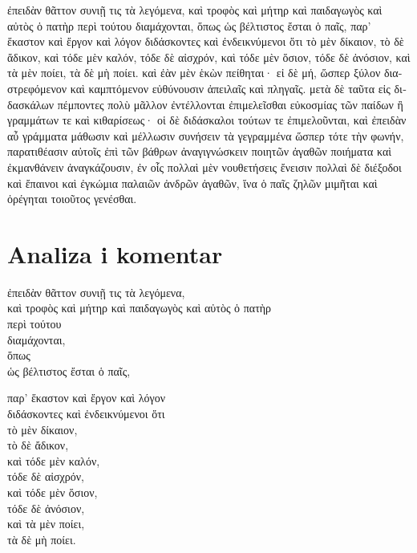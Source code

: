 {\large

\begin{greek}

\noindent ἐπειδὰν θᾶττον συνιῇ τις τὰ λεγόμενα, καὶ τροφὸς καὶ μήτηρ καὶ παιδαγωγὸς καὶ αὐτὸς ὁ πατὴρ περὶ τούτου διαμάχονται, ὅπως ὡς βέλτιστος ἔσται ὁ παῖς, παρ' ἕκαστον καὶ ἔργον καὶ λόγον διδάσκοντες καὶ ἐνδεικνύμενοι ὅτι τὸ μὲν δίκαιον, τὸ δὲ ἄδικον, καὶ τόδε μὲν καλόν, τόδε δὲ αἰσχρόν, καὶ τόδε μὲν ὅσιον, τόδε δὲ ἀνόσιον, καὶ τὰ μὲν ποίει, τὰ δὲ μὴ ποίει. καὶ ἐὰν μὲν ἑκὼν πείθηται· εἰ δὲ μή, ὥσπερ ξύλον διαστρεφόμενον καὶ καμπτόμενον εὐθύνουσιν ἀπειλαῖς καὶ πληγαῖς. μετὰ δὲ ταῦτα εἰς διδασκάλων πέμποντες πολὺ μᾶλλον ἐντέλλονται ἐπιμελεῖσθαι εὐκοσμίας τῶν παίδων ἢ γραμμάτων τε καὶ κιθαρίσεως· οἱ δὲ διδάσκαλοι τούτων τε ἐπιμελοῦνται, καὶ ἐπειδὰν αὖ γράμματα μάθωσιν καὶ μέλλωσιν συνήσειν τὰ γεγραμμένα ὥσπερ τότε τὴν φωνήν, παρατιθέασιν αὐτοῖς ἐπὶ τῶν βάθρων ἀναγιγνώσκειν ποιητῶν ἀγαθῶν ποιήματα καὶ ἐκμανθάνειν ἀναγκάζουσιν, ἐν οἷς πολλαὶ μὲν νουθετήσεις ἔνεισιν πολλαὶ δὲ διέξοδοι καὶ ἔπαινοι καὶ ἐγκώμια παλαιῶν ἀνδρῶν ἀγαθῶν, ἵνα ὁ παῖς ζηλῶν μιμῆται καὶ ὀρέγηται τοιοῦτος γενέσθαι.

\end{greek}

}


\section*{Analiza i komentar}


{\large
\begin{greek}
\noindent ἐπειδὰν θᾶττον συνιῇ τις τὰ λεγόμενα, \\
καὶ τροφὸς καὶ μήτηρ καὶ παιδαγωγὸς καὶ αὐτὸς ὁ πατὴρ \\
\tabto{2em} περὶ τούτου \\
διαμάχονται, \\
\tabto{2em} ὅπως \\
\tabto{4em} ὡς βέλτιστος ἔσται ὁ παῖς,

παρ' ἕκαστον καὶ ἔργον καὶ λόγον \\
διδάσκοντες καὶ ἐνδεικνύμενοι ὅτι \\
\tabto{2em} τὸ μὲν δίκαιον, \\
\tabto{2em} τὸ δὲ ἄδικον, \\
\tabto{2em} καὶ τόδε μὲν καλόν, \\
\tabto{2em} τόδε δὲ αἰσχρόν, \\
\tabto{2em} καὶ τόδε μὲν ὅσιον, \\
\tabto{2em} τόδε δὲ ἀνόσιον, \\
\tabto{2em} καὶ τὰ μὲν ποίει, \\
\tabto{2em} τὰ δὲ μὴ ποίει.\\

\end{greek}
}

